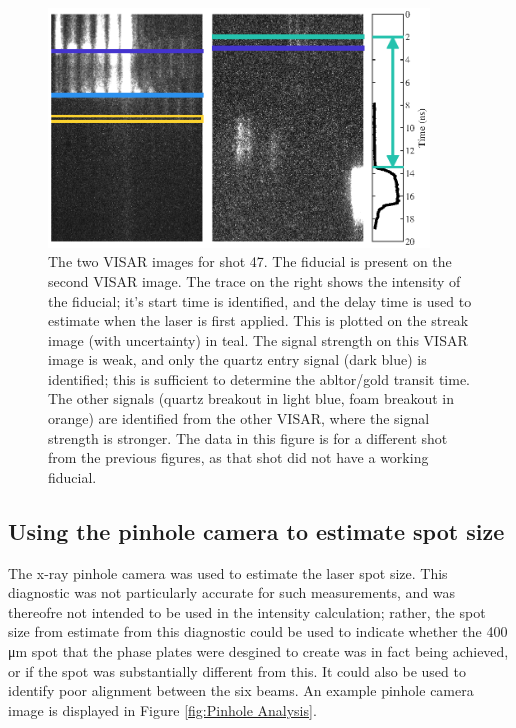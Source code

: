 \begin{figure} [h]
\begin{centering}
\includegraphics[width=0.9\textwidth]{figures/Experiment/FiduPlot.eps}%
\caption{\label{fig:Fidu} The two VISAR images for shot 47. The fiducial is present on the second VISAR image. The trace on the right shows the intensity of the fiducial; it's start time is identified, and the delay time is used to estimate when the laser is first applied. This is plotted on the streak image (with uncertainty) in teal. The signal strength on this VISAR image is weak, and only the quartz entry signal (dark blue) is identified; this is sufficient to determine the abltor/gold transit time. The other signals (quartz breakout in light blue, foam breakout in orange) are identified from the other VISAR, where the signal strength is stronger. The data in this figure is for a different shot from the previous figures, as that shot did not have a working fiducial.}
\end{centering}
\end{figure}



\subsection{Using the pinhole camera to estimate spot size} \label{Estimating spot size}

The x-ray pinhole camera was used to estimate the laser spot size. This diagnostic was not particularly accurate for such measurements, and was thereofre not intended to be used in the intensity calculation; rather, the spot size from estimate from this diagnostic could be used to indicate whether the 400 \unit{\micro\meter} spot that the phase plates were desgined to create was in fact being achieved, or if the spot was substantially different from this. It could also be used to identify poor alignment between the six beams. An example pinhole camera image is displayed in Figure \ref{fig:Pinhole Analysis}.

